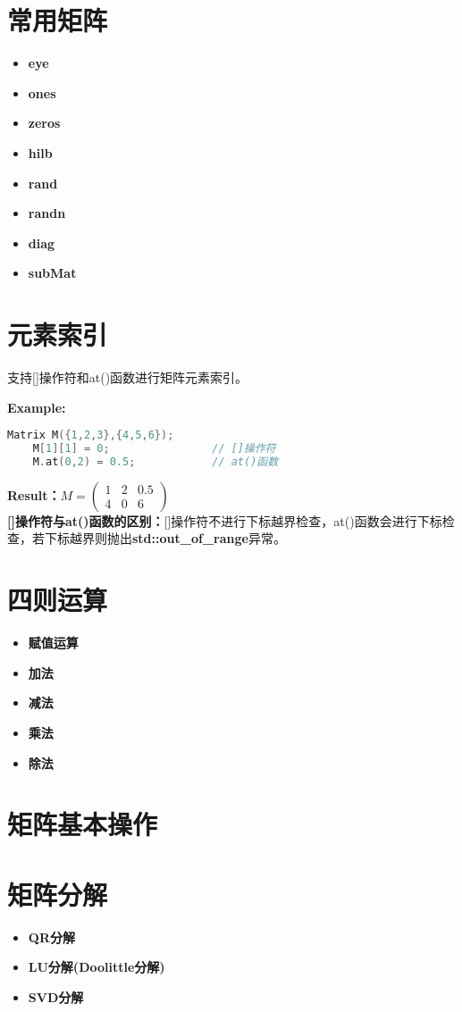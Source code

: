 \documentclass[UTF8]{ctexart}
\begin{document}
\section{常用矩阵}

\begin{itemize}
    \item \textbf{eye}
    \item \textbf{ones}
    \item \textbf{zeros}
    \item \textbf{hilb}
    \item \textbf{rand}
    \item \textbf{randn}
    \item \textbf{diag}
    \item \textbf{subMat}
\end{itemize}

\section{元素索引}
支持[]操作符和at()函数进行矩阵元素索引。

\textbf{Example:}
{
    \setmainfont{Consolas}
    \begin{lstlisting}[language=C++]
    Matrix M({1,2,3},{4,5,6});
    M[1][1] = 0;                // []操作符
    M.at(0,2) = 0.5;            // at()函数
    \end{lstlisting}
}

\textbf{Result：}$M = \left( \begin{matrix} 1 & 2 & 0.5 \\ 4 & 0 & 6 \end{matrix} \right) $\\

\textbf{[]操作符与at()函数的区别：}[]操作符不进行下标越界检查，at()函数会进行下标检查，若下标越界则抛出\textbf{std::out\_of\_range}异常。

\section{四则运算}

\begin{itemize}
    \item \textbf{赋值运算}
    \item \textbf{加法}
    \item \textbf{减法}
    \item \textbf{乘法}
    \item \textbf{除法}
\end{itemize}

\section{矩阵基本操作}

\section{矩阵分解}

\begin{itemize}
    \item \textbf{QR分解}
    \item \textbf{LU分解(Doolittle分解)}
    \item \textbf{SVD分解}
\end{itemize}
\end{document}
